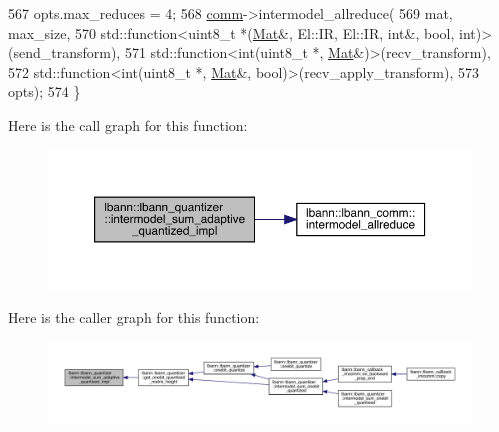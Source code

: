 \begin{DoxyCode}
567   opts.max\_reduces = 4;
568   \hyperlink{file__io_8cpp_ab048c6f9fcbcfaa57ce68b00263dbebe}{comm}->intermodel\_allreduce(
569     mat, max\_size,
570     std::function<uint8\_t *(\hyperlink{base_8hpp_a68f11fdc31b62516cb310831bbe54d73}{Mat}&, El::IR, El::IR, \textcolor{keywordtype}{int}&, \textcolor{keywordtype}{bool}, \textcolor{keywordtype}{int})>(send\_transform),
571     std::function<\textcolor{keywordtype}{int}(uint8\_t *, \hyperlink{base_8hpp_a68f11fdc31b62516cb310831bbe54d73}{Mat}&)>(recv\_transform),
572     std::function<\textcolor{keywordtype}{int}(uint8\_t *, \hyperlink{base_8hpp_a68f11fdc31b62516cb310831bbe54d73}{Mat}&, \textcolor{keywordtype}{bool})>(recv\_apply\_transform),
573     opts);
574 \}
\end{DoxyCode}
Here is the call graph for this function\+:\nopagebreak
\begin{figure}[H]
\begin{center}
\leavevmode
\includegraphics[width=350pt]{classlbann_1_1lbann__quantizer_a3fe3493cb16b85bd4eaf251980408f1b_cgraph}
\end{center}
\end{figure}
Here is the caller graph for this function\+:\nopagebreak
\begin{figure}[H]
\begin{center}
\leavevmode
\includegraphics[width=350pt]{classlbann_1_1lbann__quantizer_a3fe3493cb16b85bd4eaf251980408f1b_icgraph}
\end{center}
\end{figure}
\mbox{\label{classlbann_1_1lbann__quantizer_a4b326de1ca5b7eba6415b6f42f83335b}} 
